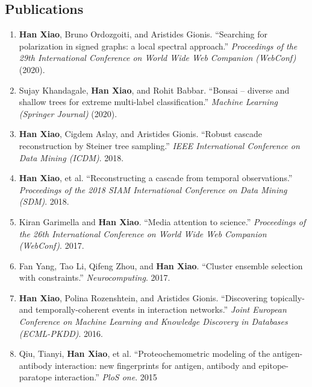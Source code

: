 \documentclass[12pt,]{scrartcl}
\begin{document}
\subsection{Publications}\label{publications}

\begin{enumerate}
  \leftskip-0.13in %
  \item \textbf{Han Xiao}, Bruno Ordozgoiti, and Aristides Gionis. ``Searching for polarization in signed graphs: a local spectral approach.'' \textit{Proceedings of the 29th International Conference on World Wide Web Companion (WebConf)}  (2020).

  \item Sujay Khandagale, \textbf{Han Xiao}, and Rohit Babbar. ``Bonsai -- diverse and shallow trees for extreme multi-label classification.'' \textit{Machine Learning (Springer Journal)} (2020).
  
  \item {\textbf{Han Xiao}, Cigdem Aslay, and Aristides Gionis. ``Robust cascade reconstruction by Steiner tree sampling.'' \textit{IEEE International Conference on Data Mining (ICDM)}.  2018.}

  \item {\textbf{Han Xiao}, et al. ``Reconstructing a cascade from temporal observations.'' \textit{Proceedings of the 2018 SIAM International Conference on Data Mining (SDM)}. 2018.}
  
  \item {Kiran Garimella and \textbf{Han Xiao}. ``Media attention to science.'' \textit{Proceedings of the 26th International Conference on World Wide Web Companion (WebConf)}. 2017.}

  \item {Fan Yang, Tao Li, Qifeng Zhou, and \textbf{Han Xiao}. ``Cluster ensemble selection with constraints.'' \textit{Neurocomputing}. 2017.}

  \item {\textbf{Han Xiao}, Polina Rozenshtein, and Aristides Gionis. ``Discovering topically-and temporally-coherent events in interaction networks.'' \textit{Joint European Conference on Machine Learning and Knowledge Discovery in Databases (ECML-PKDD)}.  2016.}

  \item {Qiu, Tianyi, \textbf{Han Xiao}, et al. ``Proteochemometric modeling of the antigen-antibody interaction: new fingerprints for antigen, antibody and epitope-paratope interaction.'' \textit{PloS one}.  2015}
\end{enumerate}
\end{document}
